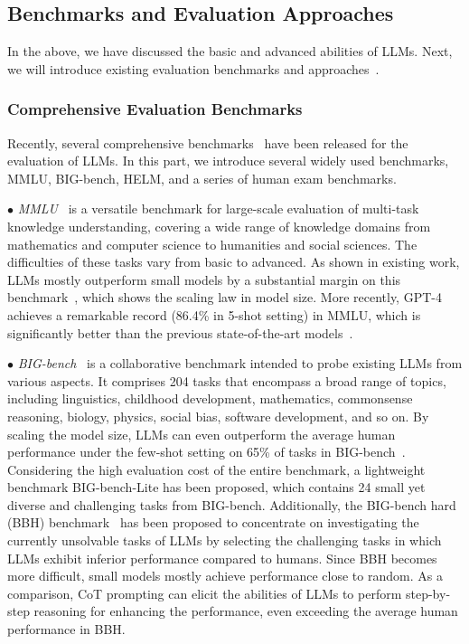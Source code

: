 \subsection{Benchmarks and Evaluation Approaches}
In the above, we have discussed the basic and advanced abilities of LLMs.
Next, we will introduce existing evaluation benchmarks and approaches~\cite{Chang-2023-arxiv-A,Zhuang-2023-arxiv-Through}.

\subsubsection{Comprehensive Evaluation Benchmarks}
Recently, several comprehensive benchmarks~\cite{Hendrycks-ICLR-2021-Measuring,Srivastava-arxiv-2022-Beyond,Liang-arxiv-2022-Holistic} have been released for the evaluation of LLMs.
In this part, we introduce several widely used benchmarks, \ie MMLU, BIG-bench, HELM, and a series of human exam benchmarks.

$\bullet$ \emph{MMLU}~\cite{Hendrycks-ICLR-2021-Measuring} is a versatile benchmark for large-scale evaluation of multi-task knowledge understanding, covering a wide range of knowledge domains {from mathematics and computer science to humanities and social sciences. The difficulties of these tasks vary from basic to advanced.} 
{As shown in existing work, LLMs mostly outperform small models by a substantial margin on this benchmark~\cite{Chowdhery-arxiv-2022-PaLM,Chung-arxiv-2022-Scaling,Taylor-arxiv-2022-Galactica,Touvron-arxiv-2023-LLaMA}, which shows the scaling law in model size. %
{More recently, GPT-4 achieves a remarkable record (86.4\% in 5-shot setting) in MMLU, which is significantly  better than the previous state-of-the-art models~\cite{OpenAI-OpenAI-2023-GPT-4}.}}

$\bullet$ \emph{BIG-bench}~\cite{Srivastava-arxiv-2022-Beyond} is a collaborative benchmark intended to probe existing LLMs from various aspects.
{It comprises 204 tasks that encompass a broad range of topics, including linguistics, childhood development, mathematics, commonsense reasoning, biology, physics, social bias, software development, and so on.}
{By scaling  the model size, LLMs can even outperform the average human performance under the few-shot setting on 65\% of tasks in BIG-bench~\cite{Chowdhery-arxiv-2022-PaLM}.}
{Considering the high evaluation cost of the entire benchmark,  a lightweight benchmark BIG-bench-Lite has been proposed, which contains  24 small yet diverse and challenging tasks from BIG-bench.}
Additionally, the BIG-bench hard (BBH) benchmark~\cite{Suzgun-arxiv-2022-Challenging} has been proposed to concentrate on investigating the currently unsolvable tasks of LLMs by selecting the challenging tasks in which LLMs exhibit inferior performance compared to humans.
Since BBH becomes more difficult, small models mostly achieve performance close to random.  
{As a comparison, CoT prompting can elicit the abilities of LLMs to perform step-by-step reasoning for enhancing the performance, even exceeding the average human performance in BBH.}

